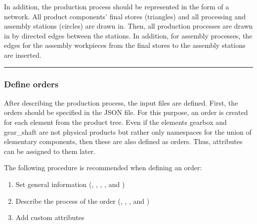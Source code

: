 \documentclass[letterpaper,10pt,english]{sphinxmanual}
\begin{document}

\sphinxAtStartPar
In addition, the production process should be represented in the form of a network. All product components’ final stores
(triangles) and all processing and assembly stations (circles) are drawn in. Then, all production processes are drawn in
by directed edges between the stations. In addition, for assembly processes, the edges for the assembly workpieces from
the final stores to the assembly stations are inserted.



\bigskip\hrule\bigskip



\subsubsection{Define orders}
\label{\detokenize{source/Examples/example01:define-orders}}\label{\detokenize{source/Examples/example01:id2}}
\sphinxAtStartPar
After describing the production process, the input files are defined. First, the orders should be specified in the JSON
file. For this purpose, an order is created for each element from the product tree. Even if the elements gearbox and
gear\_shaft are not physical products but rather only namespaces for the union of elementary components, then these are
also defined as orders. Thus, attributes can be assigned to them later.

\sphinxAtStartPar
The following procedure is recommended when defining an order:
\begin{enumerate}
%
\item {} 
\sphinxAtStartPar
Set general information (, , , , and )

\item {} 
\sphinxAtStartPar
Describe the process of the order (, , , and )

\item {} 
\sphinxAtStartPar
Add custom attributes

\end{enumerate}
\end{document}
